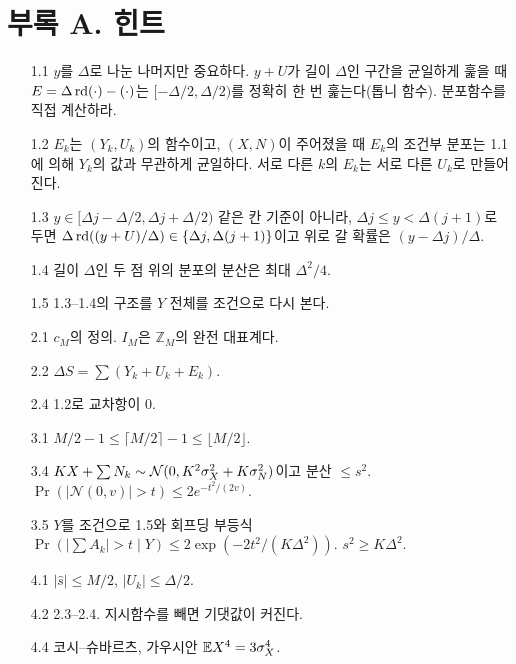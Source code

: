 \newpage
\section*{부록 A. 힌트}
\begin{itemize}[leftmargin=2.2em]
\item[1.1] $y$를 $\Delta$로 나눈 나머지만 중요하다. $y+U$가 길이 $\Delta$인 구간을 균일하게 훑을 때 $E=\Delta\operatorname{rd}(\cdot)-(\cdot)$는 $[-\Delta/2,\Delta/2)$를 정확히 한 번 훑는다(톱니 함수). 분포함수를 직접 계산하라.
\item[1.2] $E_k$는 $(Y_k,U_k)$의 함수이고, $(X,N)$이 주어졌을 때 $E_k$의 조건부 분포는 1.1에 의해 $Y_k$의 값과 무관하게 균일하다. 서로 다른 $k$의 $E_k$는 서로 다른 $U_k$로 만들어진다.
\item[1.3] $y\in[\Delta j-\Delta/2,\Delta j+\Delta/2)$ 같은 칸 기준이 아니라, $\Delta j\le y<\Delta(j+1)$로 두면 $\Delta\operatorname{rd}((y+U)/\Delta)\in\{\Delta j,\Delta(j+1)\}$이고 위로 갈 확률은 $(y-\Delta j)/\Delta$.
\item[1.4] 길이 $\Delta$인 두 점 위의 분포의 분산은 최대 $\Delta^2/4$.
\item[1.5] 1.3–1.4의 구조를 $Y$ 전체를 조건으로 다시 본다.
\item[2.1] $c_M$의 정의. $I_M$은 $\mathbb Z_M$의 완전 대표계다.
\item[2.2] $\Delta S=\sum(Y_k+U_k+E_k)$.
\item[2.4] 1.2로 교차항이 0.
\item[3.1] $M/2-1\le\lceil M/2\rceil-1\le\lfloor M/2\rfloor$.
\item[3.4] $KX+\sum N_k\sim\mathcal N(0,K^2\sigma_X^2+K\sigma_N^2)$이고 분산 $\le s^2$. $\Pr(|\mathcal N(0,v)|>t)\le2e^{-t^2/(2v)}$.
\item[3.5] $Y$를 조건으로 1.5와 회프딩 부등식 $\Pr(|\sum A_k|>t\mid Y)\le2\exp(-2t^2/(K\Delta^2))$. $s^2\ge K\Delta^2$.
\item[4.1] $|\hat s|\le M/2$, $|U_k|\le\Delta/2$.
\item[4.2] 2.3–2.4. 지시함수를 빼면 기댓값이 커진다.
\item[4.4] 코시–슈바르츠, 가우시안 $\mathbb{E} X^4=3\sigma_X^4$.
\end{itemize}

